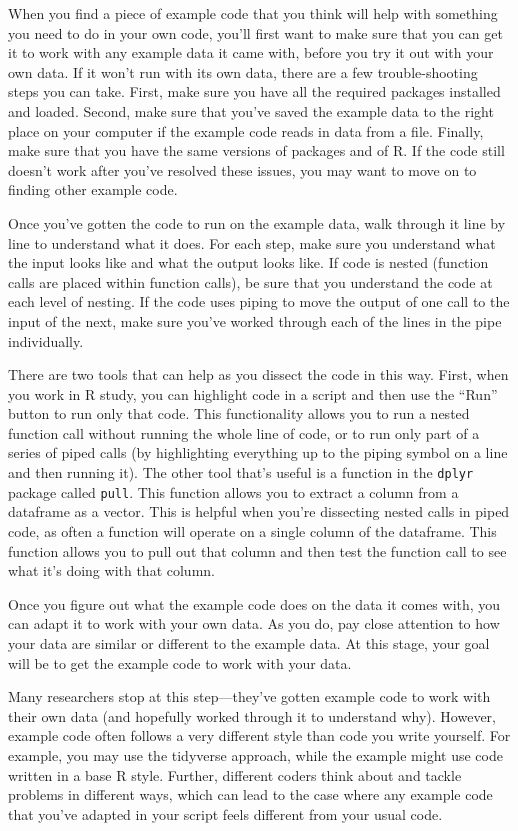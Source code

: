\documentclass[]{tufte-book}
\begin{document}
When you find a piece of example code that you think will help with something
you need to do in your own code, you'll first want to make sure that you can
get it to work with any example data it came with, before you try it out with
your own data. If it won't run with its own data, there are a few trouble-shooting
steps you can take. First, make sure you have all the required packages
installed and loaded. Second, make sure that you've saved the example data
to the right place on your computer if the example code reads in data from
a file. Finally, make sure that you have the same versions of
packages and of R. If the code still doesn't work after you've resolved these
issues, you may want to move on to finding other example code.

Once you've gotten the code to run on the example data, walk through it line
by line to understand what it does. For each step, make sure you understand
what the input looks like and what the output looks like. If code is nested
(function calls are placed within function calls), be sure that you understand
the code at each level of nesting. If the code uses piping to move the output
of one call to the input of the next, make sure you've worked through each
of the lines in the pipe individually.

There are two tools that can help as you dissect the code in this way. First,
when you work in R study, you can highlight code in a script and then use the
``Run'' button to run only that code. This functionality allows you to run a
nested function call without running the whole line of code, or to run only part
of a series of piped calls (by highlighting everything up to the piping symbol
on a line and then running it). The other tool that's useful is a function in
the \texttt{dplyr} package called \texttt{pull}. This function allows you to extract a column
from a dataframe as a vector. This is helpful when you're dissecting nested
calls in piped code, as often a function will operate on a single column of the
dataframe. This function allows you to pull out that column and then test the
function call to see what it's doing with that column.

Once you figure out what the example code does on the data it comes with, you
can adapt it to work with your own data. As you do, pay close attention to
how your data are similar or different to the example data. At this stage, your
goal will be to get the example code to work with your data.

Many researchers stop at this step---they've gotten example code to work with
their own data (and hopefully worked through it to understand why). However,
example code often follows a very different style than code you write yourself.
For example, you may use the tidyverse approach, while the example might use
code written in a base R style. Further, different coders think about and
tackle problems in different ways, which can lead to the case where any
example code that you've adapted in your script feels different from your usual
code.
\end{document}

